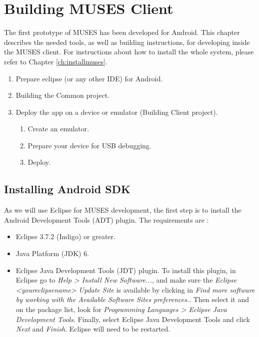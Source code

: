 \chapter{Building MUSES Client}
\label{ch:client}

The first prototype of MUSES has been developed for Android. This chapter describes the needed tools, as well as building instructions, for developing inside the MUSES client. For instructions about how to install the whole system, please refer to Chapter \ref{ch:installmuses}.

\begin{enumerate}
	\item Prepare eclipse (or any other IDE) for Android.
	\item Building the Common project.
	\item Deploy the app on a device or emulator (Building Client project).
	\begin{enumerate}[label*=\arabic*.]
		\item Create an emulator.
		\item Prepare your device for USB debugging.
		\item Deploy.
	\end{enumerate}
\end{enumerate}


\section{Installing Android SDK}
\label{sec:ADT}

As we will use Eclipse for MUSES development, the first step is to install the Android Development Tools (ADT) plugin. The requirements are \cite{adt:site}:

\begin{itemize}
  \item Eclipse 3.7.2 (Indigo) or greater.
  \item Java Platform (JDK) 6.
  \item Eclipse Java Development Tools (JDT) plugin. To install this plugin, in Eclipse go to \textit{Help > Install New Software...}, and make sure the \textit{Eclipse <youreclipsename> Update Site} is available by clicking in \textit{Find more software by working with the Available Software Sites preferences.}. Then select it and on the package list, look for \textit{Programming Languages > Eclipse Java Development Tools}. Finally, select Eclipse Java Development Tools and click \textit{Next} and \textit{Finish}. Eclipse will need to be restarted.
\end{itemize}

